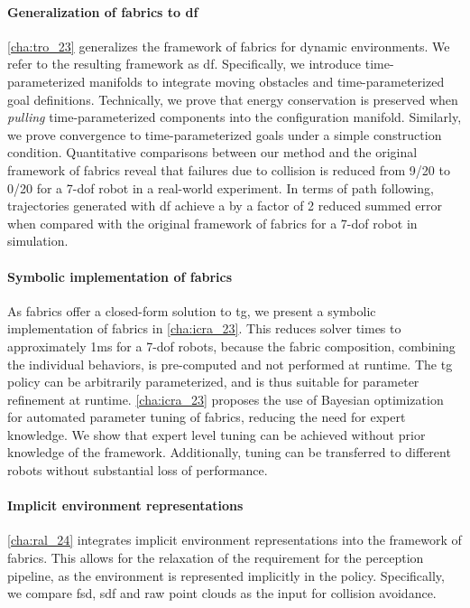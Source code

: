 \paragraph{Generalization of \ac{fabrics} to \ac{df}}
\cref{cha:tro_23} generalizes the framework of \ac{fabrics}
for dynamic environments. We refer to the resulting
framework as \ac{df}. Specifically, we introduce
time\hyp{}parameterized manifolds to integrate moving
obstacles and time\hyp{}parameterized goal definitions.
Technically,
we prove that energy conservation is preserved when
\textit{pulling} time\hyp{}parameterized components into
the configuration manifold. 
Similarly, we prove convergence to
time\hyp{}parameterized goals under a simple construction
condition. Quantitative comparisons between our method
and the original framework of \ac{fabrics} reveal
that failures due to collision is reduced from 9/20
to 0/20 for a 7-\ac{dof} robot in a real-world experiment.
In terms of path following, trajectories generated
with \ac{df} achieve a by a factor of 2 reduced summed error 
when compared with the original framework of
\ac{fabrics} for a 7-\ac{dof} robot in simulation.


\paragraph{Symbolic implementation of \ac{fabrics}}
As \ac{fabrics} offer a closed-form solution to
\ac{tg}, we present a symbolic implementation of
\ac{fabrics} in \cref{cha:icra_23}. This reduces
solver times to approximately 1ms for a 7-\ac{dof} robots, 
because the fabric composition, combining
the individual behaviors, is pre-computed and not
performed at runtime. The \ac{tg} policy can be
arbitrarily parameterized, and is thus suitable for
parameter refinement at runtime.
\cref{cha:icra_23} proposes the use of Bayesian optimization for
automated parameter tuning of \ac{fabrics},
reducing the need for expert knowledge. We show that
expert level tuning can be achieved without prior
knowledge of the framework. Additionally, tuning can
be transferred to different robots without substantial
loss of performance.

\paragraph{Implicit environment representations}
\cref{cha:ral_24} integrates implicit environment
representations into the framework of \ac{fabrics}.
This allows for the relaxation of the requirement for
the perception pipeline, as the environment is
represented implicitly in the policy.
Specifically, we compare \ac{fsd}, \ac{sdf} and raw
point clouds as the input for collision avoidance.

